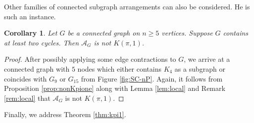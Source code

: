 \documentclass[12pt]{amsart}
\newcommand\CA{{\mathscr A}}
\numberwithin{equation}{section}
\theoremstyle{plain}
\newtheorem{corollary}[equation]{Corollary}
\theoremstyle{definition}
\begin{document}
Other families of connected subgraph arrangements can also be considered. He is such an instance. 
	
	\begin{corollary}
		\label{cor:nonKpioneG1G5}
		Let $G$ be a connected graph on $n \ge 5$ vertices. Suppose $G$ contains at least two cycles. Then $\CA_G$ is not $K(\pi,1)$. 
	\end{corollary}
	
	\begin{proof}
			After possibly applying some edge contractions to $G$, we arrive at a 
		connected graph with $5$ nodes which either contains $K_4$ as a subgraph or coincides with $G_{9}$ or $G_{15}$ from Figure \ref{fig:SC-nP}. Again, 
		it follows from Proposition \ref{prop:nonKpione} along with Lemma \ref{lem:local} and Remark \ref{rem:local} that $\CA_G$ is not $K(\pi,1)$.
	\end{proof}
	

Finally, we address Theorem \ref{thm:kpi1}.
\end{document}
